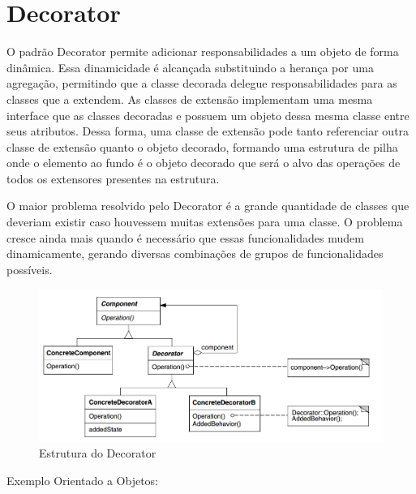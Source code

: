 \section{Decorator}

O padrão Decorator permite adicionar responsabilidades a um 
objeto de forma dinâmica. Essa dinamicidade é alcançada 
substituindo a herança por uma agregação, permitindo que a 
classe decorada delegue responsabilidades para as classes que 
a extendem. As classes de extensão implementam uma mesma 
interface que as classes decoradas e possuem um objeto dessa 
mesma classe entre seus atributos. Dessa forma, uma classe 
de extensão pode tanto referenciar outra classe de extensão 
quanto o objeto decorado, formando uma estrutura de pilha 
onde o elemento ao fundo é o objeto decorado que será o 
alvo das operações de todos os extensores presentes na 
estrutura.

O maior problema resolvido pelo Decorator é a grande 
quantidade de classes que deveriam existir caso houvessem 
muitas extensões para uma classe. O problema cresce ainda 
mais quando é necessário que essas funcionalidades mudem 
dinamicamente, gerando diversas combinações de grupos de 
funcionalidades possíveis.

\begin{figure}[htb]
	\caption{\label{decorator_struct}Estrutura do Decorator}
	\begin{center}
	    \includegraphics[scale=0.4]{5_padroes-contexto-funcional/5.2_estruturais/5.2.4_decorator/diagram.png}
	\end{center}
\end{figure}

Exemplo Orientado a Objetos:

\begin{lstlisting}[caption={Decorator Orientado a Objetos},label=oodecorator]



\end{lstlisting}

